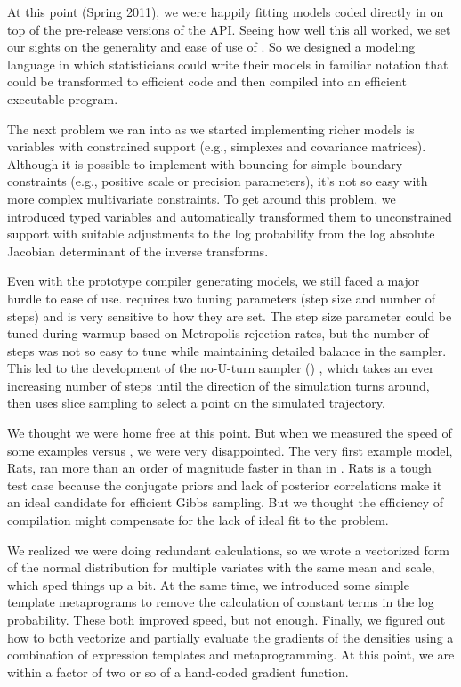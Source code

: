 At this point (Spring 2011), we were happily fitting models coded 
directly in \Cpp on top of the pre-release versions of the \Stan API. 
Seeing how well this all worked, we set our sights on the generality 
and ease of use of \BUGS.  So we designed a modeling language in which 
statisticians could write their models in familiar notation that could 
be transformed to efficient \Cpp code and then compiled into an 
efficient executable program.
 
The next problem we ran into as we started implementing richer models
is variables with constrained support (e.g., simplexes and covariance
matrices).  Although it is possible to implement \HMC with bouncing
for simple boundary constraints (e.g., positive scale or precision
parameters), it's not so easy with more complex multivariate
constraints.  To get around this problem, we introduced typed
variables and automatically transformed them to unconstrained support
with suitable adjustments to the log probability from the log absolute
Jacobian determinant of the inverse transforms.

Even with the prototype compiler generating models, we still faced a
major hurdle to ease of use.  \HMC requires two tuning parameters
(step size and number of steps) and is very sensitive to how they are
set.  The step size parameter could be tuned during warmup based on
Metropolis rejection rates, but the number of steps was not so easy to
tune while maintaining detailed balance in the sampler.  This led to
the development of the no-U-turn sampler (\NUTS)
\citep{Hoffman-Gelman:2012}, which takes an ever increasing number of
steps until the direction of the simulation turns around, then uses
slice sampling to select a point on the simulated trajectory.

We thought we were home free at this point.  But when we measured the
speed of some \BUGS examples versus \Stan, we were very disappointed.
The very first example model, Rats, ran more than an order of
magnitude faster in \JAGS than in \Stan.  Rats is a tough test case
because the conjugate priors and lack of posterior correlations make
it an ideal candidate for efficient Gibbs sampling.  But we thought
the efficiency of compilation might compensate for the lack of ideal
fit to the problem.  

We realized we were doing redundant calculations, so we wrote a
vectorized form of the normal distribution for multiple variates with
the same mean and scale, which sped things up a bit. At the same
time, we introduced some simple template metaprograms to remove the
calculation of constant terms in the log probability.  These both
improved speed, but not enough.  Finally, we figured out how to both
vectorize and partially evaluate the gradients of the densities using
a combination of expression templates and metaprogramming.  At this
point, we are within a factor of two or so of a hand-coded gradient
function.

